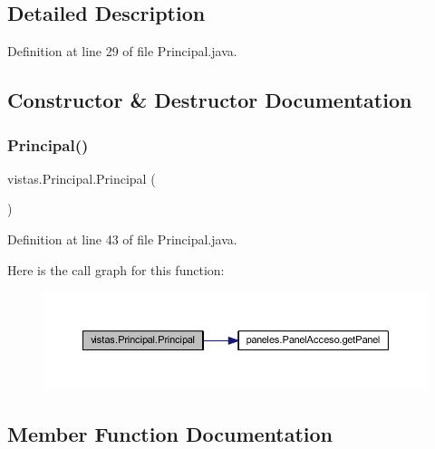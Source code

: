 \subsection{Detailed Description}


Definition at line 29 of file Principal.\+java.



\subsection{Constructor \& Destructor Documentation}
\mbox{\label{classvistas_1_1_principal_acf014fac1f15c33d980e722fe1e6d58f}} 
\subsubsection{\texorpdfstring{Principal()}{Principal()}}
{\footnotesize\ttfamily vistas.\+Principal.\+Principal (\begin{DoxyParamCaption}{ }\end{DoxyParamCaption})}



Definition at line 43 of file Principal.\+java.

Here is the call graph for this function\+:
\nopagebreak
\begin{figure}[H]
\begin{center}
\leavevmode
\includegraphics[width=350pt]{classvistas_1_1_principal_acf014fac1f15c33d980e722fe1e6d58f_cgraph}
\end{center}
\end{figure}


\subsection{Member Function Documentation}
\mbox{\label{classvistas_1_1_principal_a0f01204c3cdf3b88718a5f2c6a6d9ac9}} 
